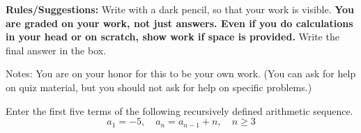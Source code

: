 \documentclass[11pt,addpoints,answers]{exam}
\newcommand{\+}{\, \, + \, \, }
\renewcommand{\-}{\, \, - \, \, }
\renewcommand{\=}{\, \, = \, \, }
\begin{document}


{\small \noindent \textbf{Rules/Suggestions:} Write with a dark pencil, so that your work is visible.  \textbf{You are graded on your work, not just answers. Even if you do calculations in your head or on scratch, show work if space is provided. } Write the final answer in the box.

Notes: You are on your honor for this to be your own work.  (You can ask for help on quiz material, but you should not ask for help on specific problems.) }

\begin{questions}
\setlength{\columnsep}{1cm}

\question[10] Enter the first five terms of the following recursively defined arithmetic sequence.
\[a_1 = -5, \quad a_n = a_{n-1} + n, \quad n\geq 3\]
\vspace{0.25in}

\begin{multicols}{5}

\begin{flushright}\end{flushright}

\columnbreak

\begin{flushright}\end{flushright}

\columnbreak

\begin{flushright}\end{flushright}

\columnbreak

\begin{flushright}\end{flushright}


\end{multicols}
\end{questions}
\end{document}
